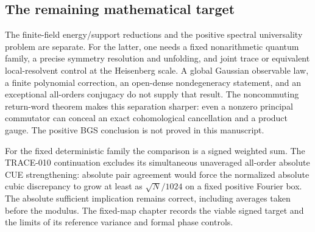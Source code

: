 \subsection{The remaining mathematical target}
The finite-field energy/support reductions and the positive spectral
universality problem are separate. For the latter, one needs a fixed
nonarithmetic quantum family, a precise symmetry resolution and unfolding,
and joint trace or equivalent local-resolvent control at the Heisenberg scale.
A global Gaussian observable law, a finite polynomial correction, an
open-dense nondegeneracy statement, and an exceptional all-orders conjugacy
do not supply that result. The noncommuting return-word theorem makes this
separation sharper: even a nonzero principal commutator can conceal an exact
cohomological cancellation and a product gauge. The positive BGS conclusion
is not proved in this manuscript.

For the fixed deterministic family the comparison is a signed weighted
sum. The TRACE-010 continuation excludes its simultaneous unaveraged
all-order absolute CUE strengthening: absolute pair agreement would force
the normalized absolute cubic discrepancy to grow at least as
$\sqrt N/1024$ on a fixed positive Fourier box. The absolute sufficient
implication remains correct, including averages taken before the modulus.
The fixed-map chapter records the viable signed target and the limits
of its reference variance and formal phase controls.
